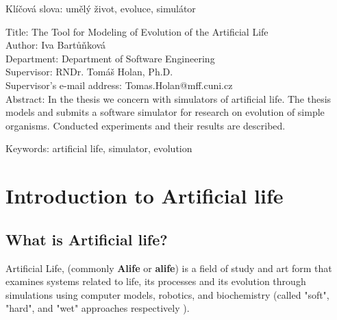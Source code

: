 \documentclass[a4paper,12pt]{report}
\begin{document}


\vspace{8mm}

\noindent Klíčová slova: umělý život, evoluce, simulátor

\vspace{10mm}

\noindent
Title: The Tool for Modeling of Evolution of the Artificial Life\\
Author: Iva Bartů\v{n}kov\'{a}\\
Department: Department of Software Engineering\\
Supervisor: RNDr. Tom\'{a}\v{s} Holan, Ph.D.\\
Supervisor's e-mail address: Tomas.Holan@mff.cuni.cz\\

\noindent Abstract: In the thesis we concern with simulators of artificial life. The thesis models and submits a software simulator for research on evolution of simple organisms. Conducted experiments and their results are described. 
 
\vspace{8mm}

\noindent Keywords: artificial life, simulator, evolution




\chapter{Introduction to Artificial life}


\section{What is Artificial life?}
Artificial Life, (commonly \textbf{Alife} or \textbf{alife}) is a field of study and art form that examines systems related to life, its processes and its evolution through simulations using computer models, robotics, and biochemistry (called "soft", "hard", and "wet" approaches respectively \cite{Bedau}).
\end{document}
